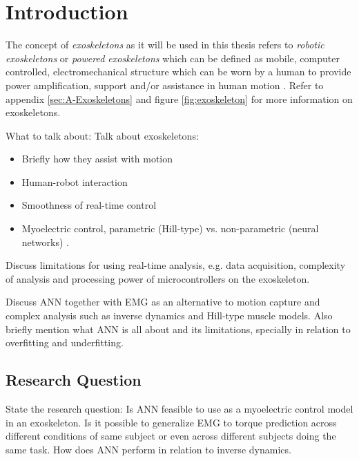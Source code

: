 \documentclass[../main.tex]{subfiles}
\begin{document}
\chapter{Introduction}
The concept of \textit{exoskeletons} as it will be used in this thesis refers to \textit{robotic exoskeletons} or \textit{powered exoskeletons} which can be defined as mobile, computer controlled, electromechanical structure which can be worn by a human to provide power amplification, support and/or assistance in human motion \cite{Anam2012, Gorgey2018}. 
Refer to appendix \ref{sec:A-Exoskeletons} and figure \ref{fig:exoskeleton} for more information on exoskeletons.

What to talk about:
Talk about exoskeletons:
\begin{itemize}
    \item Briefly how they assist with motion
    \item Human-robot interaction
    \item Smoothness of real-time control
    \item Myoelectric control, parametric (Hill-type) vs. non-parametric (neural networks) \cite{Anam2012}.
\end{itemize}

Discuss limitations for using real-time analysis, e.g. data acquisition, complexity of analysis and processing power of microcontrollers on the exoskeleton.

Discuss ANN together with EMG as an alternative to motion capture and complex analysis such as inverse dynamics and Hill-type muscle models. 
Also briefly mention what ANN is all about and its limitations, specially in relation to overfitting and underfitting.




\section{Research Question}
State the research question: Is ANN feasible to use as a myoelectric control model in an exoskeleton. Is it possible to generalize EMG to torque prediction across different conditions of same subject or even across different subjects doing the same task. How does ANN perform in relation to inverse dynamics.
\end{document}
